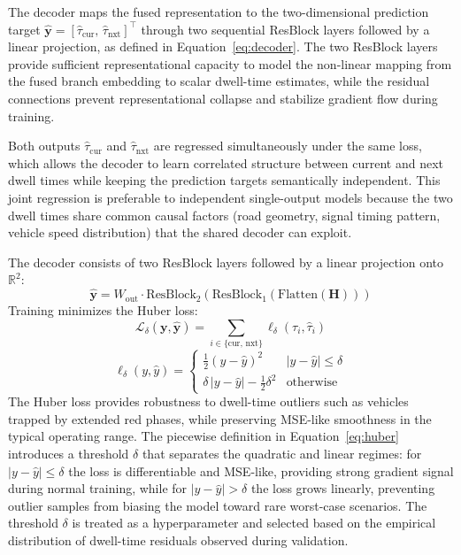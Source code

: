 \documentclass[journal]{IEEEtran}
\begin{document}
The decoder maps the fused representation to the two-dimensional prediction target $\hat{\mathbf{y}} = [\hat{\tau}_\text{cur},\, \hat{\tau}_\text{nxt}]^\top$ through two sequential ResBlock layers followed by a linear projection, as defined in Equation~\eqref{eq:decoder}.
The two ResBlock layers provide sufficient representational capacity to model the non-linear mapping from the fused branch embedding to scalar dwell-time estimates, while the residual connections prevent representational collapse and stabilize gradient flow during training.

Both outputs $\hat{\tau}_\text{cur}$ and $\hat{\tau}_\text{nxt}$ are regressed simultaneously under the same loss, which allows the decoder to learn correlated structure between current and next dwell times while keeping the prediction targets semantically independent.
This joint regression is preferable to independent single-output models because the two dwell times share common causal factors (road geometry, signal timing pattern, vehicle speed distribution) that the shared decoder can exploit.

The decoder consists of two ResBlock layers followed by a linear projection onto $\mathbb{R}^2$:
\begin{equation}
    \hat{\mathbf{y}} = W_\text{out} \cdot \text{ResBlock}_2(\text{ResBlock}_1(\text{Flatten}(\mathbf{H})))
    \label{eq:decoder}
\end{equation}
Training minimizes the Huber loss:
\begin{equation}
    \mathcal{L}_\delta(\mathbf{y}, \hat{\mathbf{y}}) = \sum_{i \in \{\text{cur, nxt}\}} \ell_\delta(\tau_i, \hat{\tau}_i)
    \label{eq:loss}
\end{equation}
\begin{equation}
    \ell_\delta(y, \hat{y}) = \begin{cases} \tfrac{1}{2}(y-\hat{y})^2 & |y-\hat{y}| \le \delta \\ \delta\,|y-\hat{y}| - \tfrac{1}{2}\delta^2 & \text{otherwise} \end{cases}
    \label{eq:huber}
\end{equation}
The Huber loss provides robustness to dwell-time outliers such as vehicles trapped by extended red phases, while preserving MSE-like smoothness in the typical operating range.
The piecewise definition in Equation~\eqref{eq:huber} introduces a threshold $\delta$ that separates the quadratic and linear regimes: for $|y - \hat{y}| \leq \delta$ the loss is differentiable and MSE-like, providing strong gradient signal during normal training, while for $|y - \hat{y}| > \delta$ the loss grows linearly, preventing outlier samples from biasing the model toward rare worst-case scenarios.
The threshold $\delta$ is treated as a hyperparameter and selected based on the empirical distribution of dwell-time residuals observed during validation.
\end{document}
